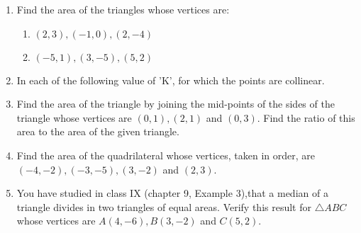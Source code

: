 \begin{enumerate}
\item Find the area of the triangles whose vertices are:
\begin{enumerate}[label=(\roman*)]
\item $(2,3), (-1,0), (2,-4)$
\item $(-5,1), (3,-5), (5,2)$
\end{enumerate}
\item In each of the following value of 'K', for which the 
points are collinear.
\item Find the area of the triangle by joining the mid-points of the sides of the triangle whose vertices are $(0,1), (2,1)$ and $(0,3)$. Find the ratio of this area to the area of the given triangle.
\item Find the area of the quadrilateral whose vertices, taken in order, are $(-4,-2), (-3,-5), (3,-2)$ and $(2,3)$. 
\item You have studied in class IX (chapter 9, Example 3),that a median of a triangle divides in two triangles of equal areas. Verify this result for $\triangle ABC$ whose vertices are $A(4,-6), B(3,-2)$ and $C(5,2)$.
\end{enumerate}


